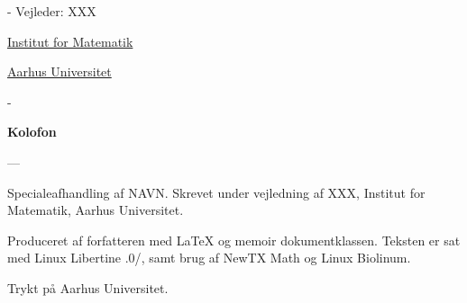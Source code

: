 \begin{titlingpage}
\begin{adjustwidth*}{\frontpagecorrection-2cm}{-\frontpagecorrection-2cm}
    Vejleder: XXX \par
    
    \vfill
    
    \fontsize{12pt}{14.5pt}\selectfont
    \href{http://www.math.au.dk/}{Institut for Matematik}\par
    \href{http://www.au.dk/}{Aarhus Universitet}
  \end{adjustwidth*}
  
    \newpage
    \begin{adjustwidth*}{\frontpagecorrection}{-\frontpagecorrection}
    	\thispagestyle{empty}
    	\strut
    	\setlength{\parindent}{0pt}
    	\addtolength{\parskip}{.6em}
    	
    	\vfill
    	
    	\begin{center}
    		\bfseries\sffamily Kolofon
    	\end{center}
    	
    	\makeatletter
    	\edef\fontandleading{\@memptsize.0/\the\baselineskip}
    	\makeatother
    	
    	\small
    	
    	\textsl{\projecttitle}
    	
    	{---\textsl{\projecttitleenglish}}
    	
    	\smallskip
    	
    	Specialeafhandling af NAVN. Skrevet under
        vejledning af XXX, Institut for Matematik, Aarhus Universitet.
    	
    	Produceret af forfatteren med \LaTeX{} og \textsf{memoir}
        dokumentklassen. Teksten er sat med Linux Libertine
        {\fontandleading}, samt brug af NewTX Math og Linux
        Biolinum.
    	
    	Trykt på Aarhus Universitet.
    	
    \end{adjustwidth*}
    
\end{titlingpage}
